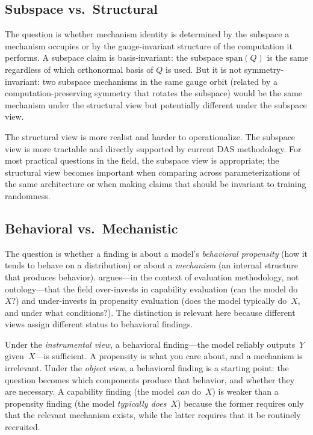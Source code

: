 \documentclass{article}
\begin{document}
\subsection{Subspace vs.\ Structural}

The question is whether mechanism identity is determined by the subspace
a mechanism occupies or by the gauge-invariant structure of the
computation it performs.  A subspace claim is basis-invariant: the
subspace $\mathrm{span}(Q)$ is the same regardless of which orthonormal
basis of $Q$ is used.  But it is not symmetry-invariant: two subspace
mechanisms in the same gauge orbit (related by a computation-preserving
symmetry that rotates the subspace) would be the same mechanism under
the structural view but potentially different under the subspace view.

The structural view is more realist and harder to operationalize.  The
subspace view is more tractable and directly supported by current DAS
methodology.  For most practical questions in the field, the subspace
view is appropriate; the structural view becomes important when
comparing across parameterizations of the same architecture or when
making claims that should be invariant to training randomness.

\subsection{Behavioral vs.\ Mechanistic}

The question is whether a finding is about a model's \emph{behavioral
propensity} (how it tends to behave on a distribution) or about a
\emph{mechanism} (an internal structure that produces behavior).
\citet{steinhardt2026} argues---in the context of evaluation
methodology, not ontology---that the field over-invests in capability
evaluation (can the model do~$X$?) and under-invests in propensity
evaluation (does the model typically do~$X$, and under what conditions?).
The distinction is relevant here because different views assign
different status to behavioral findings.

Under the \emph{instrumental view}, a behavioral finding---the model
reliably outputs~$Y$ given~$X$---is sufficient.  A propensity is what
you care about, and a mechanism is irrelevant.  Under the \emph{object
view}, a behavioral finding is a starting point: the question becomes
which components produce that behavior, and whether they are
necessary.  A capability finding (the model \emph{can} do~$X$) is
weaker than a propensity finding (the model \emph{typically does}~$X$)
because the former requires only that the relevant mechanism exists,
while the latter requires that it be routinely recruited.
\end{document}
